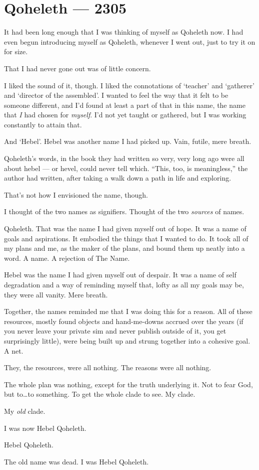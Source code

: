 \chapter*{Qoheleth — 2305}

\noindent It had been long enough that I was thinking of myself as Qoheleth now. I had even begun introducing myself as Qoheleth, whenever I went out, just to try it on for size.

That I had never gone out was of little concern.

I liked the sound of it, though. I liked the connotations of `teacher' and `gatherer' and `director of the assembled'. I wanted to feel the way that it felt to be someone different, and I'd found at least a part of that in this name, the name that \emph{I} had chosen for \emph{myself}. I'd not yet taught or gathered, but I was working constantly to attain that.

And `Hebel'. Hebel was another name I had picked up. Vain, futile, mere breath.

Qoheleth's words, in the book they had written so very, very long ago were all about hebel --- or hevel, could never tell which. ``This, too, is meaningless,'' the author had written, after taking a walk down a path in life and exploring.

That's not how I envisioned the name, though.

I thought of the two names as signifiers. Thought of the two \emph{sources} of names.

Qoheleth. That was the name I had given myself out of hope. It was a name of goals and aspirations. It embodied the things that I wanted to do. It took all of my plans and me, as the maker of the plans, and bound them up neatly into a word. A name. A rejection of The Name.

Hebel was the name I had given myself out of despair. It was a name of self degradation and a way of reminding myself that, lofty as all my goals may be, they were all vanity. Mere breath.

Together, the names reminded me that I was doing this for a reason. All of these resources, mostly found objects and hand-me-downs accrued over the years (if you never leave your private sim and never publish outside of it, you get surprisingly little), were being built up and strung together into a cohesive goal. A net.

They, the resources, were all nothing. The reasons were all nothing.

The whole plan was nothing, except for the truth underlying it. Not to fear God, but to\ldots{}to something. To get the whole clade to see. My clade.

My \emph{old} clade.

I was now Hebel Qoheleth.

Hebel Qoheleth.

The old name was dead. I was Hebel Qoheleth.
